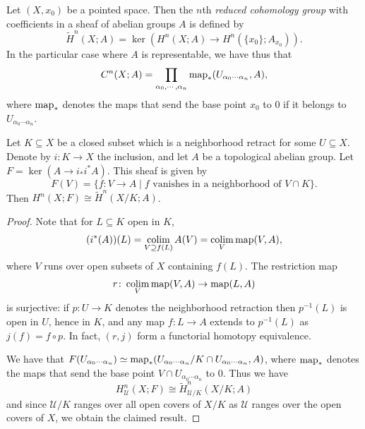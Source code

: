 \documentclass[a4paper,openany]{scrbook}
\begin{document}
\begin{defn}
Let $(X,x_0)$ be a pointed space. Then the $n$th \emph{reduced cohomology group} with coefficients in a sheaf of abelian groups $A$ is defined by
\[
\tilde H^n(X;A) = \ker(H^n(X;A) \to H^n(\{x_0\};A_{x_0})).
\]
In the particular case where $A$ is representable, we have thus that
\[
C^n(X;A) = \prod_{\alpha_0,\cdots,\alpha_n} \operatorname{map}_*(U_{\alpha_0\cdots\alpha_n},A),
\]
where $\operatorname{map}_*$ denotes the maps that send the base point $x_0$ to $0$ if it belongs to $U_{\alpha_0\cdots\alpha_n}$.
\end{defn}

\begin{lemma}\label{lemma:cohomologyofquotient}
Let $K \subseteq X$ be a closed subset which is a neighborhood retract for some $U \subseteq X$. Denote by $i\colon K \to X$ the inclusion, and let $A$ be a topological abelian group. Let $F = \ker(A \to i_*i^*A)$. This sheaf is given by
\[
F(V) = \{f\colon V \to A \mid f \text{ vanishes in a neighborhood of $V \cap K$}\}.
\]
Then $H^n(X;F) \cong \tilde H^n(X/K;A)$.
\end{lemma}
\begin{proof}
Note that for $L \subseteq K$ open in $K$, 
\[
(i^*(A))(L) = \colim_{V \supseteq f(L)} A(V) = \colim_V \map(V,A),
\]
where $V$ runs over open subsets of $X$ containing $f(L)$. The restriction map
\[
r\colon \colim_V \map(V,A) \to \map(L,A)
\]
is surjective: if $p\colon U \to K$ denotes the neighborhood retraction then $p^{-1}(L)$ is open in $U$, hence in $K$, and any map $f\colon L \to A$ extends to $p^{-1}(L)$ as $j(f) = f\circ p$. In fact, $(r,j)$ form a functorial homotopy equivalence.

We have that $F(U_{\alpha_0\cdots\alpha_n}) \simeq \operatorname{map}_*(U_{\alpha_0\cdots\alpha_n}/K \cap U_{\alpha_0\cdots\alpha_n},A)$, where $\operatorname{map}_*$ denotes the maps that send the base point $V \cap U_{\alpha_0\cdots\alpha_n}$ to $0$. Thus we have
\[
H^n_{\mathcal U}(X;F) \cong \tilde H^n_{\mathcal U/K}(X/K;A)
\]
and since $\mathcal U/K$ ranges over all open covers of $X/K$ as $\mathcal U$ ranges over the open covers of $X$, we obtain the claimed result.
\end{proof} 
\end{document}
